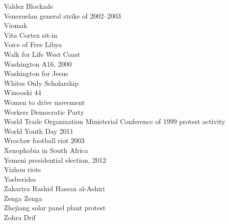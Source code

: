 Valdez Blockade\\
Venezuelan general strike of 2002–2003\\
Viomak\\
Vita Cortex sit-in\\
Voice of Free Libya\\
Walk for Life West Coast\\
Washington A16, 2000\\
Washington for Jesus\\
Whites Only Scholarship\\
Winooski 44\\
Women to drive movement\\
Workers Democratic Party\\
World Trade Organization Ministerial Conference of 1999 protest activity\\
World Youth Day 2011\\
Wrocław football riot 2003\\
Xenophobia in South Africa\\
Yemeni presidential election, 2012\\
Yizhou riots\\
Yosberides\\
Zakariya Rashid Hassan al-Ashiri\\
Zenga Zenga\\
Zhejiang solar panel plant protest\\
Zohra Drif